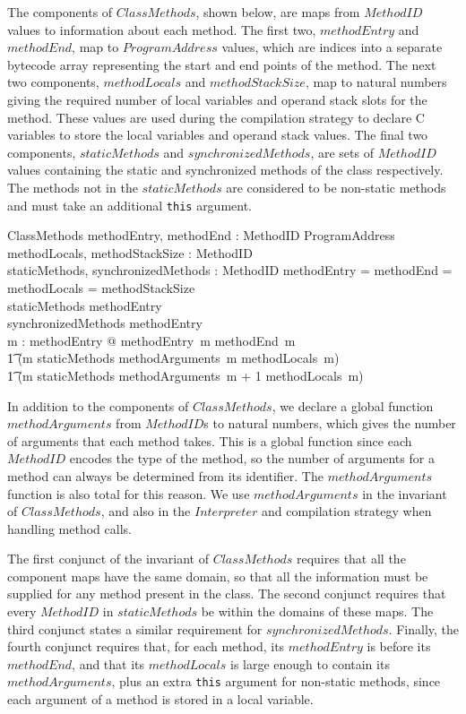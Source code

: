 The components of $ClassMethods$, shown below, are maps from
$MethodID$ values to information about each method.
The first two, $methodEntry$ and $methodEnd$, map to $ProgramAddress$
values, which are indices into a separate bytecode array representing
the start and end points of the method.
The next two components, $methodLocals$ and $methodStackSize$, map to
natural numbers giving the required number of local variables and
operand stack slots for the method.
These values are used during the compilation strategy to declare C
variables to store the local variables and operand stack values.
The final two components, $staticMethods$ and $synchronizedMethods$,
are sets of $MethodID$ values containing the static and synchronized
methods of the class respectively.
The methods not in the $staticMethods$ are considered to be non-static
methods and must take an additional \texttt{this} argument.
\begin{schema}{ClassMethods}
  methodEntry, methodEnd : MethodID \pfun ProgramAddress \\
  methodLocals, methodStackSize : MethodID \pfun \nat \\
  staticMethods, synchronizedMethods : \finset MethodID
\where
  \dom methodEntry = \dom methodEnd = \dom methodLocals = \dom methodStackSize \\
  staticMethods \subseteq \dom methodEntry \\
  synchronizedMethods \subseteq \dom methodEntry \\
  \forall m : \dom methodEntry @ methodEntry~m \leq methodEnd~m \\
  \t1 \land (m \in staticMethods \implies methodArguments~m \leq methodLocals~m) \\
  \t1 \land (m \notin staticMethods \implies methodArguments~m + 1 \leq methodLocals~m)
\end{schema}
In addition to the components of $ClassMethods$, we declare a global
function $methodArguments$ from $MethodID$s to natural numbers, which
gives the number of arguments that each method takes.
This is a global function since each $MethodID$ encodes the type of
the method, so the number of arguments for a method can always be
determined from its identifier.
The $methodArguments$ function is also total for this reason.
We use $methodArguments$ in the invariant of $ClassMethods$, and also
in the $Interpreter$ and compilation strategy when handling method
calls.

The first conjunct of the invariant of $ClassMethods$ requires that
all the component maps have the same domain, so that all the
information must be supplied for any method present in the class.
The second conjunct requires that every $MethodID$ in $staticMethods$
be within the domains of these maps.
The third conjunct states a similar requirement for
$synchronizedMethods$.
Finally, the fourth conjunct requires that, for each method, its
$methodEntry$ is before its $methodEnd$, and that its $methodLocals$
is large enough to contain its $methodArguments$, plus an extra
\texttt{this} argument for non-static methods, since each argument of
a method is stored in a local variable.

